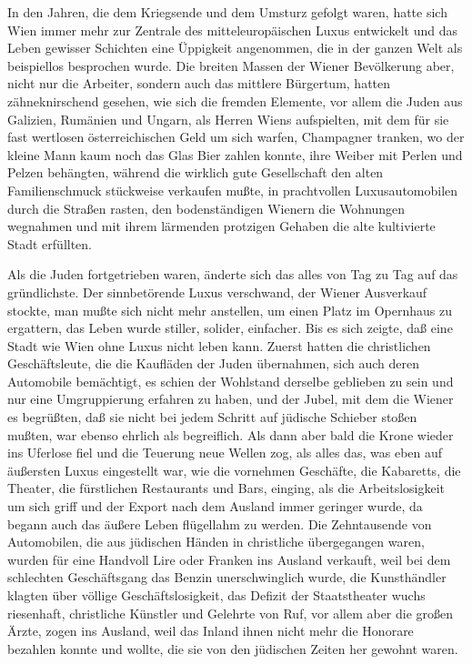 In den Jahren, die dem Kriegsende und dem Umsturz gefolgt waren,
hatte sich Wien immer mehr zur Zentrale des mitteleuropäischen
Luxus entwickelt und das Leben gewisser Schichten eine Üppigkeit
angenommen, die in der ganzen Welt als beispiellos besprochen
wurde. Die breiten Massen der Wiener Bevölkerung aber, nicht nur
die Arbeiter, sondern auch das mittlere Bürgertum, hatten
zähneknirschend gesehen, wie sich die fremden Elemente, vor allem
die Juden aus Galizien, Rumänien und Ungarn, als Herren Wiens
aufspielten, mit dem für sie fast wertlosen österreichischen Geld
um sich warfen, Champagner tranken, wo der kleine Mann kaum noch
das Glas Bier  zahlen konnte, ihre Weiber mit Perlen
und Pelzen behängten, während die wirklich gute Gesellschaft den
alten Familienschmuck stückweise verkaufen mußte, in prachtvollen
Luxusautomobilen durch die Straßen rasten, den bodenständigen
Wienern die Wohnungen wegnahmen und mit ihrem lärmenden protzigen
Gehaben die alte kultivierte Stadt erfüllten.

Als die Juden fortgetrieben waren, änderte sich das alles von Tag
zu Tag auf das gründlichste. Der sinnbetörende Luxus verschwand,
der Wiener Ausverkauf stockte, man mußte sich nicht mehr anstellen,
um einen Platz im Opernhaus zu ergattern, das Leben wurde stiller,
solider, einfacher. Bis es sich zeigte, daß eine Stadt wie Wien
ohne Luxus nicht leben kann. Zuerst hatten die christlichen
Geschäftsleute, die die Kaufläden der Juden übernahmen, sich auch
deren Automobile bemächtigt, es schien der Wohlstand derselbe
geblieben zu sein und nur eine Umgruppierung erfahren zu haben, und
der Jubel, mit dem die Wiener es begrüßten, daß sie nicht bei jedem
Schritt auf jüdische Schieber stoßen mußten, war ebenso ehrlich als
begreiflich. Als dann aber bald die Krone wieder ins Uferlose fiel
und die Teuerung neue Wellen zog, als alles das, was eben auf
äußersten Luxus eingestellt war, wie die vornehmen Geschäfte, die
Kabaretts, die Theater, die fürstlichen Restaurants und Bars,
einging, als die Arbeitslosigkeit um sich griff und der Export nach
dem Ausland immer geringer wurde, da begann auch das äußere Leben
flügellahm zu werden. Die Zehntausende von Automobilen, die aus
jüdischen Händen in christliche  übergegangen waren,
wurden für eine Handvoll Lire oder Franken ins Ausland verkauft,
weil bei dem schlechten Geschäftsgang das Benzin unerschwinglich
wurde, die Kunsthändler klagten über völlige Geschäftslosigkeit,
das Defizit der Staatstheater wuchs riesenhaft, christliche
Künstler und Gelehrte von Ruf, vor allem aber die großen Ärzte,
zogen ins Ausland, weil das Inland ihnen nicht mehr die Honorare
bezahlen konnte und wollte, die sie von den jüdischen Zeiten her
gewohnt waren.


